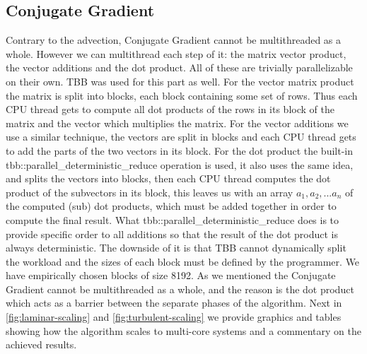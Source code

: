 \subsection{Conjugate Gradient}
Contrary to the advection, Conjugate Gradient cannot be multithreaded as a whole. However we can multithread each step of it: the matrix vector product, the vector additions and the dot product. All of these are trivially parallelizable on their own. TBB was used for this part as well. For the vector matrix product the matrix is split into blocks, each block containing some set of rows. Thus each CPU thread gets to compute all dot products of the rows in its block of the matrix and the vector which multiplies the matrix. For the vector additions we use a similar technique, the vectors are split in blocks and each CPU thread gets to add the parts of the two vectors in its block. For the dot product the built-in tbb::parallel\_deterministic\_reduce operation is used, it also uses the same idea, and splits the vectors into blocks, then each CPU thread computes the dot product of the subvectors in its block, this leaves us with an array $a_1, a_2, ... a_n$ of the computed (sub) dot products, which must be added together in order to compute the final result. What tbb::parallel\_deterministic\_reduce does is to provide specific order to all additions so that the result of the dot product is always deterministic. The downside of it is that TBB cannot dynamically split the workload and the sizes of each block must be defined by the programmer. We have empirically chosen blocks of size 8192. As we mentioned the Conjugate Gradient cannot be multithreaded as a whole, and the reason is the dot product which acts as a barrier between the separate phases of the algorithm. Next in \cref{fig:laminar-scaling} and \cref{fig:turbulent-scaling} we provide graphics and tables showing how the algorithm scales to multi-core systems and a commentary on the achieved results.


